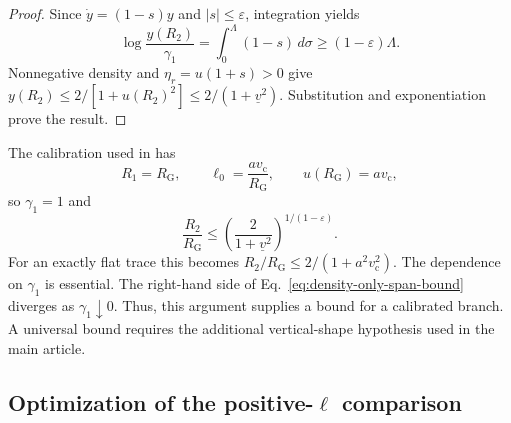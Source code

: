 \documentclass[11pt,a4paper]{article}
\numberwithin{equation}{section}
\theoremstyle{plain}
\theoremstyle{definition}
\theoremstyle{remark}
\newcommand{\ellzero}{\ell_0}
\newcommand{\RG}{R_{\mathrm G}}
\newcommand{\vc}{v_{\mathrm c}}
\begin{document}
\begin{proof}
Since $\dot y=(1-s)y$ and $|s|\leqslant\varepsilon$, integration yields
\begin{equation}\label{eq:y-integrated-growth-density-only}
\log\frac{y(R_2)}{\gamma_1}=\int_0^\Lambda(1-s)\,d\sigma
\geqslant(1-\varepsilon)\Lambda.
\end{equation}
Nonnegative density and $\eta_r=u(1+s)>0$ give
$y(R_2)\leqslant2/[1+u(R_2)^2]\leqslant 2/(1+\underline v^2)$.
Substitution and exponentiation prove the result.
\end{proof}
The calibration used in \cite{Astesiano2022EPJC} has
\begin{equation}\label{eq:paper-edge-calibration-approx}
R_1=\RG,\qquad
\ellzero=\frac{a\vc}{\RG},\qquad
u(\RG)=a\vc,
\end{equation}
so $\gamma_1=1$ and
\begin{equation}\label{eq:paper-edge-approx-flat-bound}
\frac{R_2}{\RG}\leqslant
\left(\frac{2}{1+\underline v^2}\right)^{1/(1-\varepsilon)}.
\end{equation}
For an exactly flat trace this becomes $R_2/\RG\leqslant2/(1+a^2\vc^2)$. The dependence on $\gamma_1$ is essential. The right-hand side of Eq.~\eqref{eq:density-only-span-bound} diverges as $\gamma_1\downarrow 0$. Thus, this argument supplies a bound for a calibrated branch. A universal bound requires the additional vertical-shape hypothesis used in the main article.

\subsection{Optimization of the positive-\texorpdfstring{$\ell$}{ell} comparison}
\end{document}
